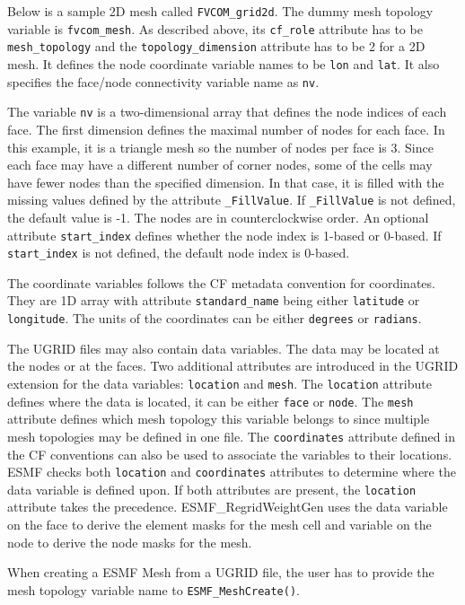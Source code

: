Below is a sample 2D mesh called {\tt FVCOM\_grid2d}. The dummy mesh topology variable is {\tt fvcom\_mesh}.  As described above, its {\tt cf\_role} attribute has to be {\tt mesh\_topology}
and the {\tt topology\_dimension} attribute has to be 2 for a 2D mesh.  It defines
the node coordinate variable names to be {\tt lon} and {\tt lat}.  It also specifies the face/node connectivity variable name as {\tt nv}.

The variable {\tt nv} is a two-dimensional array that defines the node indices of each face. The first dimension
defines the maximal number of nodes for each face. In this example, it is a
triangle mesh so the number of nodes per face is 3.  Since each face may have a different number of corner nodes,
some of the cells may have fewer nodes than the specified dimension. In that case, it is filled with the
missing values defined by the attribute {\tt \_FillValue}.  If {\tt \_FillValue} is not defined, the default value
is -1. The nodes are in counterclockwise order.  An optional attribute
{\tt start\_index} defines whether the node index is 1-based or 0-based.  If {\tt start\_index} is not defined, 
the default node index is 0-based.

The coordinate variables follows the CF metadata convention for coordinates.  They are 1D array with attribute
{\tt standard\_name} being either {\tt latitude} or {\tt longitude}.  The units of the coordinates can be either {\tt degrees} or {\tt radians}.

The UGRID files may also contain data variables.  The data may be located at the nodes or at the faces.  Two additional attributes are introduced in the UGRID extension for the data variables:  {\tt location} and {\tt mesh}.  The {\tt location}
attribute defines where the data is located, it can be either {\tt face} or {\tt node}.  The {\tt mesh} attribute defines which mesh topology this variable belongs to since multiple mesh topologies may be defined in one
file.  The {\tt coordinates} attribute defined in the CF conventions can also be used to associate the variables to their locations.  ESMF checks both {\tt location} and {\tt coordinates} attributes to determine where the data variable is defined upon. If both attributes are present, the {\tt location} attribute takes the precedence.  ESMF\_RegridWeightGen uses the data variable on the face to derive the element masks for the mesh cell and variable on the node to derive the node masks for the mesh.

When creating a ESMF Mesh from a UGRID file, the user has to provide the mesh topology variable name to {\tt ESMF\_MeshCreate()}.


